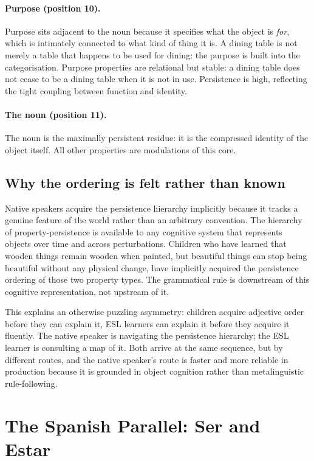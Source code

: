 \documentclass[11pt]{article}
\theoremstyle{rthm}
\theoremstyle{rdef}
\theoremstyle{remark}
\begin{document}
\paragraph{Purpose (position 10).}
Purpose sits adjacent to the noun because it specifies what the object is
\emph{for}, which is intimately connected to what kind of thing it is. A
dining table is not merely a table that happens to be used for dining: the
purpose is built into the categorisation. Purpose properties are relational
but stable: a dining table does not cease to be a dining table when it is
not in use. Persistence is high, reflecting the tight coupling between
function and identity.

\paragraph{The noun (position 11).}
The noun is the maximally persistent residue: it is the compressed identity
of the object itself. All other properties are modulations of this core.

\subsection{Why the ordering is felt rather than known}

Native speakers acquire the persistence hierarchy implicitly because it tracks
a genuine feature of the world rather than an arbitrary convention. The
hierarchy of property-persistence is available to any cognitive system that
represents objects over time and across perturbations. Children who have
learned that wooden things remain wooden when painted, but beautiful things
can stop being beautiful without any physical change, have implicitly acquired
the persistence ordering of those two property types. The grammatical rule
is downstream of this cognitive representation, not upstream of it.

This explains an otherwise puzzling asymmetry: children acquire adjective
order before they can explain it, ESL learners can explain it before they
acquire it fluently. The native speaker is navigating the persistence
hierarchy; the ESL learner is consulting a map of it. Both arrive at the
same sequence, but by different routes, and the native speaker's route is
faster and more reliable in production because it is grounded in object
cognition rather than metalinguistic rule-following.

\section{The Spanish Parallel: Ser and Estar}
\label{sec:spanish}
\end{document}
